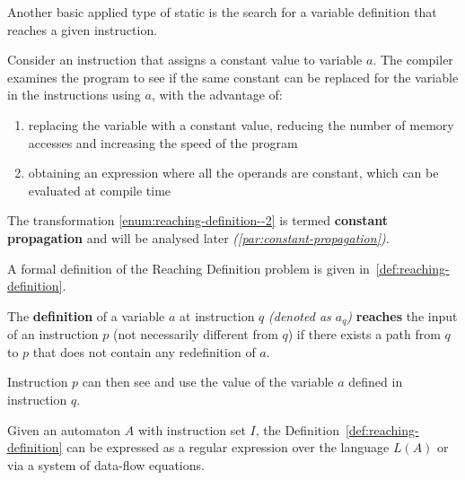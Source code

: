 \documentclass[english]{article}
\begin{document}
Another basic applied type of static  is the search for a variable definition that reaches a given instruction.

Consider an instruction that assigns a constant value to variable \(a\).
The compiler examines the program to see if the same constant can be replaced for the variable in the instructions using \(a\), with the advantage of:

\begin{enumerate}[label=\arabic*., ref=\arabic*.]
  \item\label{enum:reaching-definition--1} replacing the variable with a constant value, reducing the number of memory accesses and increasing the speed of the program
  \item\label{enum:reaching-definition--2} obtaining an expression where all the operands are constant, which can be evaluated at compile time
\end{enumerate}

The transformation \ref{enum:reaching-definition--2} is termed \textbf{constant propagation} and will be analysed later \textit{(\ref{par:constant-propagation})}.

A formal definition of the Reaching Definition problem is given in~\ref{def:reaching-definition}.

\begin{definition}
  \label{def:reaching-definition}
  The \textbf{definition} of a variable \(a\) at instruction \(q\) \textit{(denoted as \(a_q\))} \textbf{reaches} the input of an instruction \(p\) (not necessarily different from \(q\)) if there exists a path from \(q\) to \(p\) that does not contain any redefinition of \(a\).
\end{definition}

Instruction \(p\) can then see and use the value of the variable \(a\) defined in instruction \(q\).

Given an automaton \(A\) with instruction set \(I\), the Definition~\ref{def:reaching-definition} can be expressed as a regular expression over the language \(L(A)\) or via a system of data-flow equations.
\end{document}
